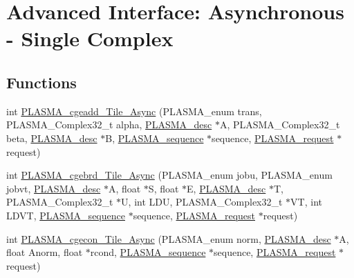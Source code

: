 \hypertarget{group__PLASMA__Complex32__t__Tile__Async}{}\section{Advanced Interface\+: Asynchronous -\/ Single Complex}
\label{group__PLASMA__Complex32__t__Tile__Async}
\subsection*{Functions}
\begin{DoxyCompactItemize}
\item 
int \hyperlink{group__PLASMA__Complex32__t__Tile__Async_ga5e4525a8ab1eca6b3e69704ec839329a_ga5e4525a8ab1eca6b3e69704ec839329a}{P\+L\+A\+S\+M\+A\+\_\+cgeadd\+\_\+\+Tile\+\_\+\+Async} (P\+L\+A\+S\+M\+A\+\_\+enum trans, P\+L\+A\+S\+M\+A\+\_\+\+Complex32\+\_\+t alpha, \hyperlink{structplasma__desc__t}{P\+L\+A\+S\+M\+A\+\_\+desc} $\ast$A, P\+L\+A\+S\+M\+A\+\_\+\+Complex32\+\_\+t beta, \hyperlink{structplasma__desc__t}{P\+L\+A\+S\+M\+A\+\_\+desc} $\ast$B, \hyperlink{structplasma__sequence__t}{P\+L\+A\+S\+M\+A\+\_\+sequence} $\ast$sequence, \hyperlink{structplasma__request__t}{P\+L\+A\+S\+M\+A\+\_\+request} $\ast$request)
\item 
int \hyperlink{group__PLASMA__Complex32__t__Tile__Async_ga41dad4c8b251edda7a19c9df46a7ab04_ga41dad4c8b251edda7a19c9df46a7ab04}{P\+L\+A\+S\+M\+A\+\_\+cgebrd\+\_\+\+Tile\+\_\+\+Async} (P\+L\+A\+S\+M\+A\+\_\+enum jobu, P\+L\+A\+S\+M\+A\+\_\+enum jobvt, \hyperlink{structplasma__desc__t}{P\+L\+A\+S\+M\+A\+\_\+desc} $\ast$A, float $\ast$S, float $\ast$E, \hyperlink{structplasma__desc__t}{P\+L\+A\+S\+M\+A\+\_\+desc} $\ast$T, P\+L\+A\+S\+M\+A\+\_\+\+Complex32\+\_\+t $\ast$U, int L\+D\+U, P\+L\+A\+S\+M\+A\+\_\+\+Complex32\+\_\+t $\ast$V\+T, int L\+D\+V\+T, \hyperlink{structplasma__sequence__t}{P\+L\+A\+S\+M\+A\+\_\+sequence} $\ast$sequence, \hyperlink{structplasma__request__t}{P\+L\+A\+S\+M\+A\+\_\+request} $\ast$request)
\item 
int \hyperlink{group__PLASMA__Complex32__t__Tile__Async_ga421d027b9c601130d9a8352e027bc707_ga421d027b9c601130d9a8352e027bc707}{P\+L\+A\+S\+M\+A\+\_\+cgecon\+\_\+\+Tile\+\_\+\+Async} (P\+L\+A\+S\+M\+A\+\_\+enum norm, \hyperlink{structplasma__desc__t}{P\+L\+A\+S\+M\+A\+\_\+desc} $\ast$A, float Anorm, float $\ast$rcond, \hyperlink{structplasma__sequence__t}{P\+L\+A\+S\+M\+A\+\_\+sequence} $\ast$sequence, \hyperlink{structplasma__request__t}{P\+L\+A\+S\+M\+A\+\_\+request} $\ast$request)

\end{DoxyCompactItemize}
